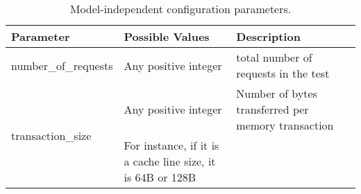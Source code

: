 \begin{table*}[ht] 
\scriptsize
\centering
\caption{Model-independent configuration parameters.\label{tb:config}}
\begin{tabular}{|l|p{1.2cm}|p{9cm}|p{5cm}|}
  \hline
  Parameter & \multicolumn{2}{l|}{Possible Values} & Description \\
  \hline
number\_of\_requests &  \multicolumn{2}{l|}{Any positive integer} & total number of requests in the test\\ 
\hline
\multirow{2}{*}{transaction\_size} & \multicolumn{2}{l|}{Any positive integer} & {Number of bytes transferred per memory transaction} \\
& \multicolumn{2}{l|}{For instance, if it is a cache line size, it is 64B or 128B} &\\
\hline
\end{tabular}
\label{tb:vars}
\end{table*}

